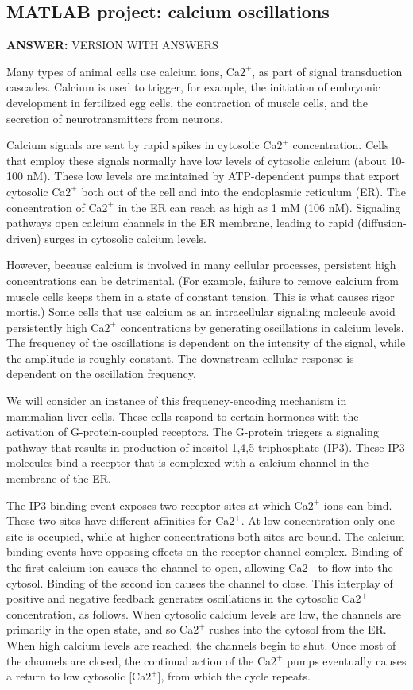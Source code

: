 \documentclass[12pt]{article}
\newcommand{\ans}[1]{

{\bf ANSWER:} #1\medskip}
\begin{document}
\subsection*{MATLAB project: calcium oscillations}

\ans{VERSION WITH ANSWERS}

Many types of animal cells use calcium ions, Ca$2^+$, as part of signal
transduction cascades. Calcium is used to trigger, for example, the initiation
of embryonic development in fertilized egg cells, the contraction of muscle
cells, and the secretion of neurotransmitters from neurons.

Calcium signals are sent by rapid spikes in cytosolic Ca$2^+$ concentration.
Cells that employ these signals normally have low levels of cytosolic calcium
(about 10-100 nM). These low levels are maintained by ATP-dependent pumps that
export cytosolic Ca$2^+$ both out of the cell and into the endoplasmic
reticulum (ER). The concentration of Ca$2^+$ in the ER can reach as high as 1
mM (106 nM). Signaling pathways open calcium channels in the ER membrane,
leading to rapid (diffusion-driven) surges in cytosolic calcium levels.

However, because calcium is involved in many cellular processes, persistent
high concentrations can be detrimental. (For example, failure to remove
calcium from muscle cells keeps them in a state of constant tension.  This is
what causes rigor mortis.) Some cells that use calcium as an intracellular
signaling molecule avoid persistently high Ca$2^+$ concentrations by generating
oscillations in calcium levels. The frequency of the oscillations is dependent
on the intensity of the signal, while the amplitude is roughly constant. The
downstream cellular response is dependent on the oscillation frequency.

We will consider an instance of this frequency-encoding mechanism in mammalian
liver cells.  These cells respond to certain hormones with the activation of
G-protein-coupled receptors. The G-protein triggers a
signaling pathway that results in production of inositol 1,4,5-triphosphate
(IP3). These IP3 molecules bind a receptor that is complexed with a calcium
channel in the membrane of the ER.

The IP3 binding event exposes two receptor sites at which Ca$2^+$ ions can
bind.  These two sites have different affinities for Ca$2^+$.  At low 
concentration only one site is occupied, while at higher concentrations both
sites are bound. The calcium binding events have opposing effects on the
receptor-channel complex.  Binding of the first calcium ion causes the channel
to open, allowing Ca$2^+$ to flow into the cytosol.  Binding of the second ion
causes the channel to close. This interplay of positive and negative feedback
generates oscillations in the cytosolic Ca$2^+$ concentration, as follows. When
cytosolic calcium levels are low, the channels are primarily in the open
state, and so Ca$2^+$ rushes into the cytosol from the ER. When high calcium
levels are reached, the channels begin to shut. Once most of the channels are
closed, the continual action of the Ca$2^+$ pumps eventually causes a return to
low cytosolic [Ca$2^+$], from which the cycle repeats.
\end{document}
